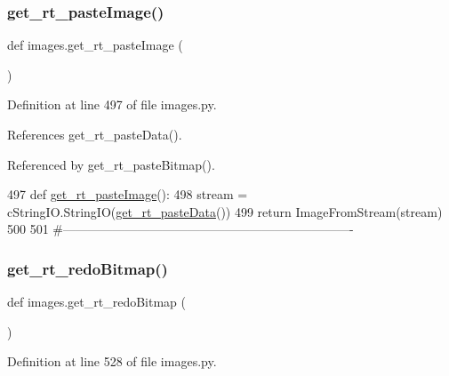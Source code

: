 \mbox{\label{namespaceimages_aafce09d643eafa16868d813270beb9e3}} 
\subsubsection{\texorpdfstring{get\+\_\+rt\+\_\+paste\+Image()}{get\_rt\_pasteImage()}}
{\footnotesize\ttfamily def images.\+get\+\_\+rt\+\_\+paste\+Image (\begin{DoxyParamCaption}{ }\end{DoxyParamCaption})}



Definition at line 497 of file images.\+py.



References get\+\_\+rt\+\_\+paste\+Data().



Referenced by get\+\_\+rt\+\_\+paste\+Bitmap().


\begin{DoxyCode}
497 \textcolor{keyword}{def }\hyperlink{namespaceimages_aafce09d643eafa16868d813270beb9e3}{get\_rt\_pasteImage}():
498     stream = cStringIO.StringIO(\hyperlink{namespaceimages_add410f080839e1241e8a9c07e2d46490}{get\_rt\_pasteData}())
499     \textcolor{keywordflow}{return} ImageFromStream(stream)
500 
501 \textcolor{comment}{#----------------------------------------------------------------------}
\end{DoxyCode}
\mbox{\label{namespaceimages_a94ee2c1c9ec4237ce584c034da68d6ea}} 
\subsubsection{\texorpdfstring{get\+\_\+rt\+\_\+redo\+Bitmap()}{get\_rt\_redoBitmap()}}
{\footnotesize\ttfamily def images.\+get\+\_\+rt\+\_\+redo\+Bitmap (\begin{DoxyParamCaption}{ }\end{DoxyParamCaption})}



Definition at line 528 of file images.\+py.



